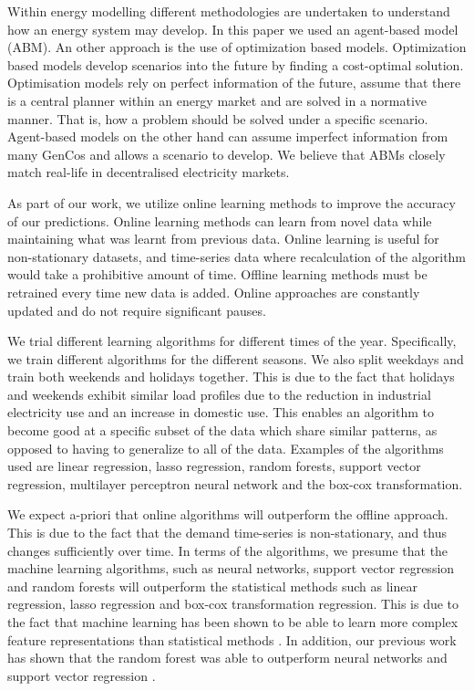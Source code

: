 \documentclass[final,3p,times,twocolumn,numbers]{elsarticle}
\begin{document}
Within energy modelling different methodologies are undertaken to understand how an energy system may develop. In this paper we used an agent-based model (ABM). An other approach is the use of optimization based models. Optimization based models develop scenarios into the future by finding a cost-optimal solution. Optimisation models rely on perfect information of the future, assume that there is a central planner within an energy market and are solved in a normative manner. That is, how a problem should be solved under a specific scenario. Agent-based models on the other hand can assume imperfect information from many GenCos and allows a scenario to develop. We believe that ABMs closely match real-life in decentralised electricity markets. 



As part of our work, we utilize online learning methods to improve the accuracy of our predictions. Online learning methods can learn from novel data while maintaining what was learnt from previous data. Online learning is useful for non-stationary datasets, and time-series data where recalculation of the algorithm would take a prohibitive amount of time. Offline learning methods must be retrained every time new data is added. Online approaches are constantly updated and do not require significant pauses. %

We trial different learning algorithms for different times of the year. Specifically, we train different algorithms for the different seasons. We also split weekdays and train both weekends and holidays together. This is due to the fact that holidays and weekends exhibit similar load profiles due to the reduction in industrial electricity use and an increase in domestic use. This enables an algorithm to become good at a specific subset of the data which share similar patterns, as opposed to having to generalize to all of the data. Examples of the algorithms used are linear regression, lasso regression, random forests, support vector regression, multilayer perceptron neural network and the box-cox transformation. 

We expect a-priori that online algorithms will outperform the offline approach. This is due to the fact that the demand time-series is non-stationary, and thus changes sufficiently over time. In terms of the algorithms, we presume that the machine learning algorithms, such as neural networks, support vector regression and random forests will outperform the statistical methods such as linear regression, lasso regression and box-cox transformation regression. This is due to the fact that machine learning has been shown to be able to learn more complex feature representations than statistical methods \cite{Singh2012}. In addition, our previous work has shown that the random forest was able to outperform neural networks and support vector regression \cite{Kell2018}. 
\end{document}
